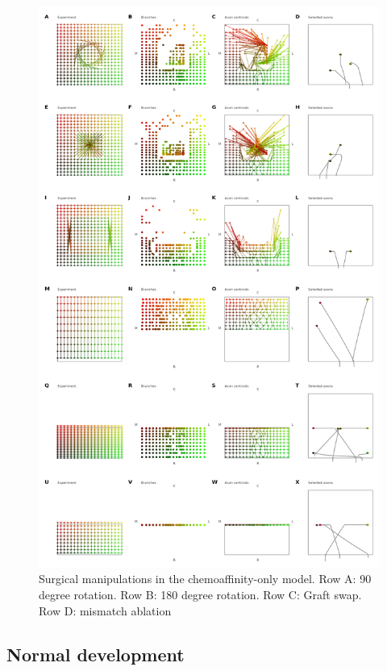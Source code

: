 \documentclass[11pt, a4paper]{article}
\begin{document}
%
%
\begin{figure}
\includegraphics[width=0.8\linewidth]{./images/fig_chemo_manipulations.png}
\caption{Surgical manipulations in the chemoaffinity-only model. Row A: 90 degree
rotation. Row B: 180 degree rotation. Row C: Graft swap. Row D: mismatch ablation}
\label{f:chsurg}
\end{figure}

\subsection*{Normal development}
\end{document}

